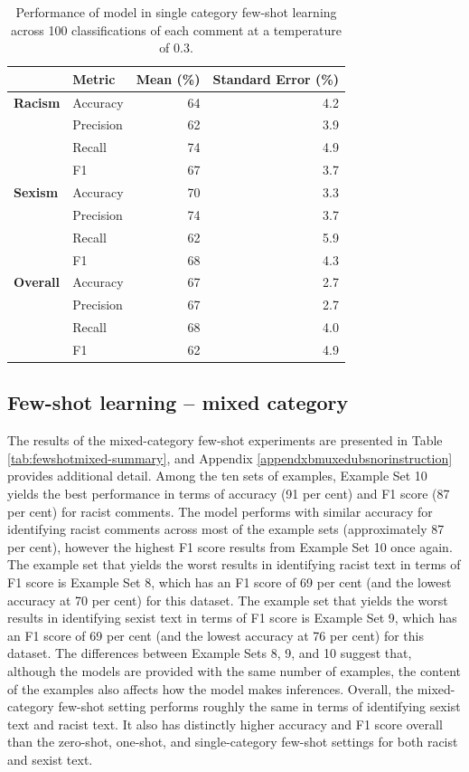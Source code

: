 \documentclass[12pt,]{article}
\begin{document}
\begin{table}

\caption{\label{tab:fewshotsingle-summary}Performance of model in single category few-shot learning across 100 classifications of each comment at a temperature of 0.3.}
\centering
\begin{tabular}[t]{>{}llrr}
\toprule
 & Metric & Mean (\%) & Standard Error (\%)\\
\midrule
\textbf{Racism} & Accuracy & 64 & 4.2\\
\textbf{} & Precision & 62 & 3.9\\
\textbf{} & Recall & 74 & 4.9\\
\textbf{} & F1 & 67 & 3.7\\
\textbf{Sexism} & Accuracy & 70 & 3.3\\
\textbf{} & Precision & 74 & 3.7\\
\textbf{} & Recall & 62 & 5.9\\
\textbf{} & F1 & 68 & 4.3\\
\textbf{Overall} & Accuracy & 67 & 2.7\\
\textbf{} & Precision & 67 & 2.7\\
\textbf{} & Recall & 68 & 4.0\\
\textbf{} & F1 & 62 & 4.9\\
\bottomrule
\end{tabular}
\end{table}

\hypertarget{few-shot-learning-mixed-category}{%
\subsection{Few-shot learning -- mixed category}\label{few-shot-learning-mixed-category}}

The results of the mixed-category few-shot experiments are presented in Table \ref{tab:fewshotmixed-summary}, and Appendix \ref{appendxbmuxedubsnorinstruction} provides additional detail. Among the ten sets of examples, Example Set 10 yields the best performance in terms of accuracy (91 per cent) and F1 score (87 per cent) for racist comments. The model performs with similar accuracy for identifying racist comments across most of the example sets (approximately 87 per cent), however the highest F1 score results from Example Set 10 once again. The example set that yields the worst results in identifying racist text in terms of F1 score is Example Set 8, which has an F1 score of 69 per cent (and the lowest accuracy at 70 per cent) for this dataset. The example set that yields the worst results in identifying sexist text in terms of F1 score is Example Set 9, which has an F1 score of 69 per cent (and the lowest accuracy at 76 per cent) for this dataset. The differences between Example Sets 8, 9, and 10 suggest that, although the models are provided with the same number of examples, the content of the examples also affects how the model makes inferences. Overall, the mixed-category few-shot setting performs roughly the same in terms of identifying sexist text and racist text. It also has distinctly higher accuracy and F1 score overall than the zero-shot, one-shot, and single-category few-shot settings for both racist and sexist text.
\end{document}
